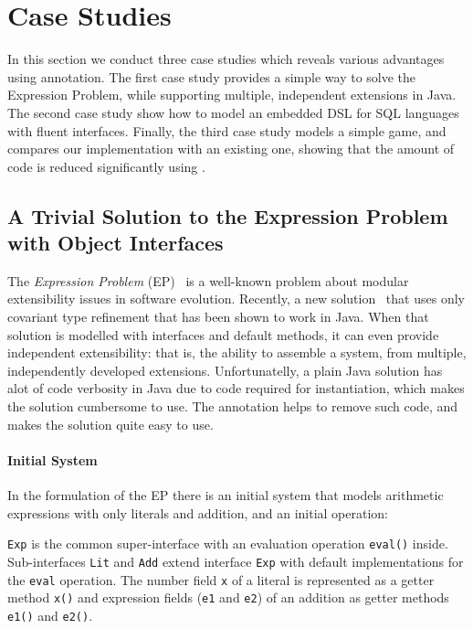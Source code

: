 \section{Case Studies}
In this section we conduct three case studies which reveals various
advantages using \mixin annotation. The first case study provides a
simple way to solve the Expression Problem, while supporting multiple,
independent extensions in Java.  The second case study show how to model an
embedded DSL for SQL languages with fluent interfaces. Finally, the third 
case study models a simple game, and compares our implementation with an 
existing one, showing that the amount of code is reduced significantly using \mixin.

\subsection{A Trivial Solution to the Expression Problem with Object Interfaces}

The \emph{Expression Problem} (EP)~\cite{wadler98expression}
is a well-known problem about modular extensibility issues in software
evolution. Recently, a new solution~\cite{eptrivially} that uses only
covariant type refinement that has been shown to work in Java. When
that solution is modelled with interfaces and default methods, it can
even provide independent extensibility: that is, the ability to
assemble a system, from multiple, independently developed extensions.
Unfortunatelly, a plain Java solution has alot of code verbosity in
Java due to code required for instantiation, which makes the solution 
cumbersome to use. The \mixin annotation helps to remove such code, and 
makes the solution quite easy to use.

\paragraph{Initial System}
In the formulation of the EP there is an initial system that models
arithmetic expressions with only literals and addition, and an initial 
operation:


\noindent \texttt{Exp} is the common super-interface with an evaluation operation
\texttt{eval()} inside. Sub-interfaces \texttt{Lit} and \texttt{Add} extend
interface \texttt{Exp} with default implementations for the \texttt{eval}
operation. The number field \texttt{x} of a literal is represented as a getter
method \texttt{x()} and expression fields (\texttt{e1} and \texttt{e2}) of an addition as
getter methods \texttt{e1()} and \texttt{e2()}.


